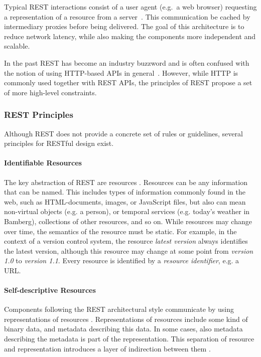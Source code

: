 Typical \ac{REST} interactions consist of a user agent (e.g.\ a web browser) requesting a representation of a resource from a server~\cite{Erenkrantz2007}.
This communication be cached by intermediary proxies before being delivered.
The goal of this architecture is to reduce network latency, while also making the components more independent and scalable.

In the past \ac{REST} has become an industry buzzword and is often confused with the notion of using \acs{HTTP}-based \acp{API} in general~\cite{Fielding2017}.
However, while \ac{HTTP} is commonly used together with \ac{REST} \acp{API}, the principles of \ac{REST} propose a set of more high-level constraints.

\subsubsection{REST Principles}

Although \ac{REST} does not provide a concrete set of rules or guidelines, several principles for \ac{REST}ful design exist.

\paragraph{Identifiable Resources}

The key abstraction of \ac{REST} are resources \cite{Fielding2000,Erenkrantz2007}.
Resources can be any information that can be named.
This includes types of information commonly found in the web, such as \acs{HTML}-documents, images, or JavaScript files, but also can mean non-virtual objects (e.g. a person), or temporal services (e.g. today's weather in Bamberg), collections of other resources, and so on.
While resources may change over time, the semantics of the resource must be static.
For example, in the context of a version control system, the resource \textit{latest version} always identifies the latest version, although this resource may change at some point from \textit{version 1.0} to \textit{version 1.1}.
Every resource is identified by a \textit{resource identifier}, e.g. a \ac{URL}. 

\paragraph{Self-descriptive Resources}

Components following the \ac{REST} architectural style communicate by using representations of resources \cite{Fielding2000}.
Representations of resources include some kind of binary data, and metadata describing this data.
In some cases, also metadata describing the metadata is part of the representation.
This separation of resource and representation introduces a layer of indirection between them \cite{Erenkrantz2007}.

